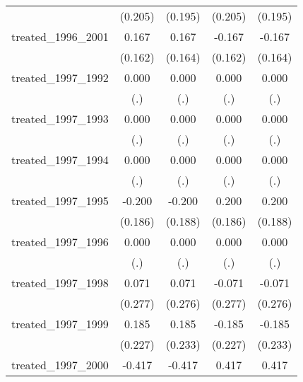 {\begin{tabular}{l*{4}{c}}
            &     (0.205)         &     (0.195)         &     (0.205)         &     (0.195)         \\
[1em]
treated\_1996\_2001&       0.167         &       0.167         &      -0.167         &      -0.167         \\
            &     (0.162)         &     (0.164)         &     (0.162)         &     (0.164)         \\
[1em]
treated\_1997\_1992&       0.000         &       0.000         &       0.000         &       0.000         \\
            &         (.)         &         (.)         &         (.)         &         (.)         \\
[1em]
treated\_1997\_1993&       0.000         &       0.000         &       0.000         &       0.000         \\
            &         (.)         &         (.)         &         (.)         &         (.)         \\
[1em]
treated\_1997\_1994&       0.000         &       0.000         &       0.000         &       0.000         \\
            &         (.)         &         (.)         &         (.)         &         (.)         \\
[1em]
treated\_1997\_1995&      -0.200         &      -0.200         &       0.200         &       0.200         \\
            &     (0.186)         &     (0.188)         &     (0.186)         &     (0.188)         \\
[1em]
treated\_1997\_1996&       0.000         &       0.000         &       0.000         &       0.000         \\
            &         (.)         &         (.)         &         (.)         &         (.)         \\
[1em]
treated\_1997\_1998&       0.071         &       0.071         &      -0.071         &      -0.071         \\
            &     (0.277)         &     (0.276)         &     (0.277)         &     (0.276)         \\
[1em]
treated\_1997\_1999&       0.185         &       0.185         &      -0.185         &      -0.185         \\
            &     (0.227)         &     (0.233)         &     (0.227)         &     (0.233)         \\
[1em]
treated\_1997\_2000&      -0.417         &      -0.417         &       0.417         &       0.417         \\

\end{tabular}}
